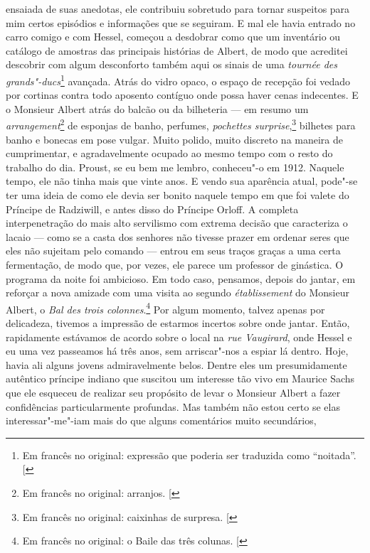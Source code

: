 ensaiada de suas anedotas, ele contribuiu sobretudo para tornar
suspeitos para mim certos episódios e informações que se seguiram. E mal
ele havia entrado no carro comigo e com Hessel, começou a desdobrar como
que um inventário ou catálogo de amostras das principais histórias de
Albert, de modo que acreditei descobrir com algum desconforto também
aqui os sinais de uma \emph{tournée des grands"-ducs}\footnote{Em francês no original: expressão que poderia ser traduzida como ``noitada''. {[}\versal{N.~T.}{]}} avançada. Atrás do
vidro opaco, o espaço de recepção foi vedado por cortinas contra todo
aposento contíguo onde possa haver cenas indecentes. E o Monsieur Albert
atrás do balcão ou da bilheteria --- em resumo um \emph{arrangement}\footnote{Em francês no original: arranjos. {[}\versal{N.~T.}{]}} de
esponjas de banho, perfumes, \emph{pochettes surprise},\footnote{Em francês no original: caixinhas de surpresa. {[}\versal{N.~T.}{]}} bilhetes para
banho e bonecas em pose vulgar. Muito polido, muito discreto na maneira
de cumprimentar, e agradavelmente ocupado ao mesmo tempo com o resto do
trabalho do dia. Proust, se eu bem me lembro, conheceu"-o em 1912.
Naquele tempo, ele não tinha mais que vinte anos. E vendo sua aparência
atual, pode"-se ter uma ideia de como ele devia ser bonito naquele tempo
em que foi valete do Príncipe de Radziwill, e antes disso do Príncipe
Orloff. A completa interpenetração do mais alto servilismo com extrema
decisão que caracteriza o lacaio --- como se a casta dos senhores não
tivesse prazer em ordenar seres que eles não sujeitam pelo comando ---
entrou em seus traços graças a uma certa fermentação, de modo que, por
vezes, ele parece um professor de ginástica. O programa da noite foi
ambicioso. Em todo caso, pensamos, depois do jantar, em reforçar a nova
amizade com uma visita ao segundo \emph{établissement} do Monsieur
Albert, o \emph{Bal des trois colonnes}.\footnote{Em francês no original: o Baile das três colunas. {[}\versal{N.~T.}{]}} Por algum momento, talvez
apenas por delicadeza, tivemos a impressão de estarmos incertos sobre
onde jantar. Então, rapidamente estávamos de acordo sobre o local na
\emph{rue Vaugirard}, onde Hessel e eu uma vez passeamos há três anos,
sem arriscar"-nos a espiar lá dentro. Hoje, havia ali alguns jovens
admiravelmente belos. Dentre eles um presumidamente autêntico príncipe
indiano que suscitou um interesse tão vivo em Maurice Sachs que ele
esqueceu de realizar seu propósito de levar o Monsieur Albert a fazer
confidências particularmente profundas. Mas também não estou certo se
elas interessar"-me"-iam mais do que alguns comentários muito secundários,
